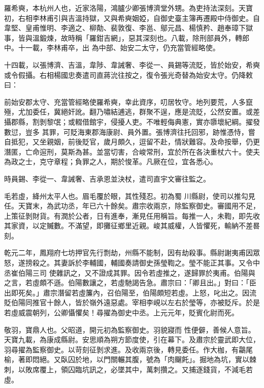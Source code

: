\begin{pinyinscope}
 羅希奭，本杭州人也，近家洛陽，鴻臚少卿張博濟堂外甥。為吏持法深刻。天寶初，右相李林甫引與吉溫持獄，又與希奭姻婭，自御史臺主簿再遷殿中侍御史。自韋堅、皇甫惟明、李適之、柳勣、裴敦復、李邕、鄔元昌、楊慎矜、趙奉璋下獄事，皆與溫鍛煉，故時稱「羅鉗吉網」，惡其深刻也。八載，除刑部員外，轉郎中。十一載，李林甫卒，出
 為中部、始安二太守，仍充當管經略使。



 十四載，以張博濟、吉溫，韋陟、韋誡奢、李從一、員錫等流貶，皆於始安，希奭或令假攝。右相楊國忠奏遣司直蔣沇往按之，復令張光奇替為始安太守。仍降敕曰：



 前始安郡太守、充當管經略使羅希奭，幸此資序，叨居牧守。地列要荒，人多竄殛，尤加委任，冀絕奸訛。翻乃嘯結逋逃，群聚不逞，應是流貶，公然安置。或差攝郡縣，割剝黎氓；或輟借館宇，侵擾人吏。不唯輕侮典憲，實亦隳壞紀綱。擢發數愆，豈多
 其罪，可貶海東郡海康尉、員外置。張博濟往托回邪，跡惟憑恃，嘗自抵犯，又坐親姻，前後貶官，歲月頗久，逗留不赴，情狀難容。及命按舉，仍更潛匿，亡命逭刑，莫斯為甚。並當切害，合峻常刑，宜於所在各決重杖六十。使夫為政之士，克守章程；負罪之人，期於悛革。凡厥在位，宜各悉心。



 時員錫、李從一、韋誡奢、吉承恩並決杖，遣司直宇文審往監之。



 毛若虛，絳州太平人也。眉毛覆於眼，其性殘忍。初為蜀
 川縣尉，使司以推勾見任。天寶末，為武功丞，年已六十餘矣。肅宗收兩京，除監察御史。審國用不足，上策征剝財貨。有潤於公者，日有進奉，漸見任用稱旨。每推一人，未鞫，即先收其家資，以定贓數。不滿望，即攤征鄉里近親。峻其威權，人皆懼死，輸納不差晷刻。



 乾元二年，鳳翔府七坊押官先行剽劫，州縣不能制，因有劫殺事。縣尉謝夷甫因眾怒，遂搒殺之。其妻訴於李輔國，輔國奏請御史孫瑩鞫之。瑩不能正其事。又令中丞崔伯陽三司
 使雜訊之，又不證成其罪。因令若虛推之，遂歸罪於夷甫。伯陽與之言，若虛頗不遜。伯陽數讓之，若虛馳謁告急。肅宗曰：「卿且出。」對曰：「臣出即死矣。」肅宗潛留若虛簾內，召伯陽至，伯陽頗短若虛。上怒，叱出之。因流貶伯陽同推官十餘人，皆於嶺外遠惡處。宰相李峴以左右於瑩等，亦被貶斥。於是若虛威震朝列，公卿懾懼矣！尋擢為御史中丞。上元元年，貶賓化尉而死。



 敬羽，寶鼎人也。父昭道，開元初為監察御史。羽貌寢而
 性便僻，善候人意旨。天寶九載，為康成縣尉。安思順為朔方節度使，引在幕下。及肅宗於靈武即大位，羽尋擢為監察御史。以苛刻征剝求進。及收兩京後，轉見委任。作大枷，有鸘尾榆，著即悶絕。又臥囚於地，以門關輾其腹，號為「肉飀飥」。掘地為坑，實以棘刺，以敗席覆上，領囚臨坑訊之，必墜其中，萬刺攢之。又捕逐錢貨，不減毛若虛。




\end{pinyinscope}
